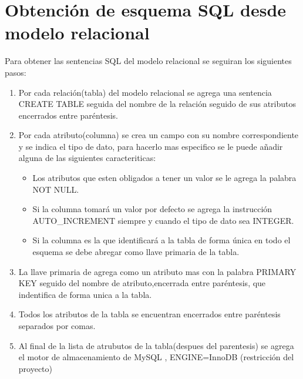 \section{Obtención de esquema SQL desde modelo relacional}

Para obtener las sentencias SQL del modelo relacional se seguiran los siguientes pasos:

\begin{enumerate}
  \item Por cada relación(tabla) del modelo relacional se agrega una sentencia CREATE TABLE seguida del nombre de la relación seguido de sus atributos encerrados entre paréntesis.
  \item Por cada atributo(columna) se crea un campo con su nombre correspondiente y se indica el tipo de dato, para hacerlo mas especifico se le puede añadir alguna de las siguientes caracteriticas:
  \begin{itemize}
    \item Los atributos que esten obligados a tener un valor se le agrega la palabra NOT NULL.
    \item Si la columna tomará un valor por defecto se agrega la instrucción AUTO\_INCREMENT siempre y cuando el tipo de dato sea INTEGER.
    \item Si la columna es la que identificará a la tabla de forma única en todo el esquema se debe abregar como llave primaria de la tabla.
  \end{itemize}
  \item La llave primaria de agrega como un atributo mas con la palabra PRIMARY KEY seguido del nombre de atributo,encerrada entre paréntesis, que indentifica de forma unica a la tabla.
  \item Todos los atributos de la tabla se encuentran encerrados entre paréntesis separados por comas.
  \item Al final de la lista de atrubutos de la tabla(despues del parentesis) se agrega el motor de almacenamiento de MySQL , ENGINE=InnoDB (restricción del proyecto)

\end{enumerate}